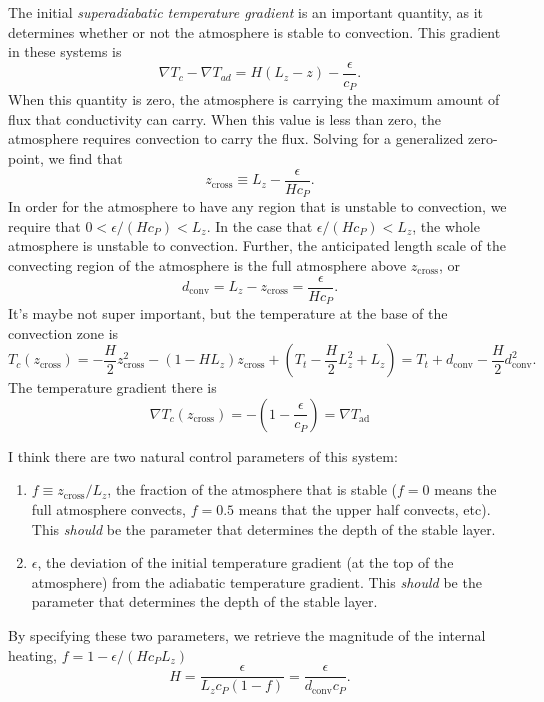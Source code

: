 \documentclass[aps, pre, onecolumn, nofootinbib, notitlepage, groupedaddress, amsfonts, amssymb, amsmath, longbibliography]{revtex4-1}
\newcommand{\grad}{\ensuremath{\nabla}}
\begin{document}
The initial \emph{superadiabatic temperature gradient} is an important quantity, as it
determines whether or not the atmosphere is stable to convection.  This gradient
in these systems is
\begin{equation}
\grad T_{c} - \grad T_{ad} = H(L_z - z) - \frac{\epsilon}{c_P}.
\end{equation}
When this quantity is zero, the atmosphere is carrying the maximum amount of flux
that conductivity can carry.  When this value is less than zero, the atmosphere
requires convection to carry the flux.  Solving for a generalized zero-point, we
find that
\begin{equation}
z_{\text{cross}} \equiv L_z - \frac{\epsilon}{H c_P}.
\end{equation}
In order for the atmosphere to have any region that is unstable to convection,
we require that $0 < \epsilon / ( H c_P ) < L_z$.  In the case that 
$\epsilon / ( H c_P ) < L_z$, the whole atmosphere is unstable to convection.
Further, the anticipated length scale of the convecting region of the atmosphere
is the full atmosphere above $z_{\text{cross}}$, or
\begin{equation}
d_{\text{conv}} = L_z - z_{\text{cross}} = \frac{\epsilon}{H c_P}.
\end{equation}
It's maybe not super important, but the temperature at the base of the convection zone is
$$
T_c(z_{\text{cross}}) = -\frac{H}{2}z_{\text{cross}}^2 - (1 - HL_z)z_{\text{cross}}
+ \left(T_t - \frac{H}{2}L_z^2 + L_z\right) = T_t + d_{\text{conv}} - \frac{H}{2} d_{\text{conv}}^2.
$$
The temperature gradient there is
$$
\grad T_c(z_{\text{cross}}) = -\left(1 - \frac{\epsilon}{c_P}\right) = \grad T_{\text{ad}}
$$

I think there are two natural control parameters of this system:
\begin{enumerate}
\item $f \equiv z_{\text{cross}} / L_z$, the fraction of the atmosphere that is stable
($f = 0$ means the full atmosphere convects, $f = 0.5$ means that the upper half convects, etc).
This \emph{should} be the parameter that determines the depth of the stable layer.
\item $\epsilon$, the deviation of the initial temperature gradient (at the top of the atmosphere)
from the adiabatic temperature gradient. This \emph{should} be the parameter that determines
the depth of the stable layer.
\end{enumerate}
By specifying these two parameters, we retrieve the magnitude of the internal heating,
$ f = 1 - \epsilon / (H c_P L_z)$
\begin{equation}
\boxed{
H = \frac{\epsilon}{L_z c_P (1 - f)} = \frac{\epsilon}{d_{\text{conv}}c_P}}.
\end{equation}
\end{document}
